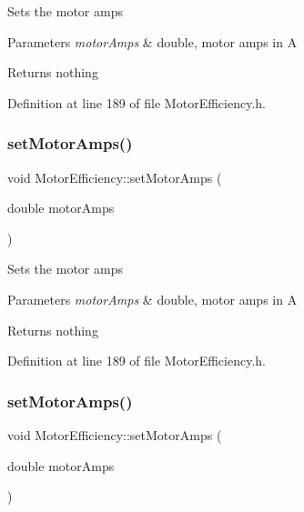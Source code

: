 Sets the motor amps


\begin{DoxyParams}{Parameters}
{\em motor\+Amps} & double, motor amps in A\\
\hline
\end{DoxyParams}
\begin{DoxyReturn}{Returns}
nothing 
\end{DoxyReturn}


Definition at line 189 of file Motor\+Efficiency.\+h.

\mbox{\label{class_motor_efficiency_ac86aa8d6162e63eb440e07e557534c74}} 
\subsubsection{\texorpdfstring{set\+Motor\+Amps()}{setMotorAmps()}\hspace{0.1cm}{\footnotesize\ttfamily [2/3]}}
{\footnotesize\ttfamily void Motor\+Efficiency\+::set\+Motor\+Amps (\begin{DoxyParamCaption}\item[{double}]{motor\+Amps }\end{DoxyParamCaption})\hspace{0.3cm}{\ttfamily [inline]}}

Sets the motor amps


\begin{DoxyParams}{Parameters}
{\em motor\+Amps} & double, motor amps in A\\
\hline
\end{DoxyParams}
\begin{DoxyReturn}{Returns}
nothing 
\end{DoxyReturn}


Definition at line 189 of file Motor\+Efficiency.\+h.

\mbox{\label{class_motor_efficiency_ac86aa8d6162e63eb440e07e557534c74}} 
\subsubsection{\texorpdfstring{set\+Motor\+Amps()}{setMotorAmps()}\hspace{0.1cm}{\footnotesize\ttfamily [3/3]}}
{\footnotesize\ttfamily void Motor\+Efficiency\+::set\+Motor\+Amps (\begin{DoxyParamCaption}\item[{double}]{motor\+Amps }\end{DoxyParamCaption})\hspace{0.3cm}{\ttfamily [inline]}}

